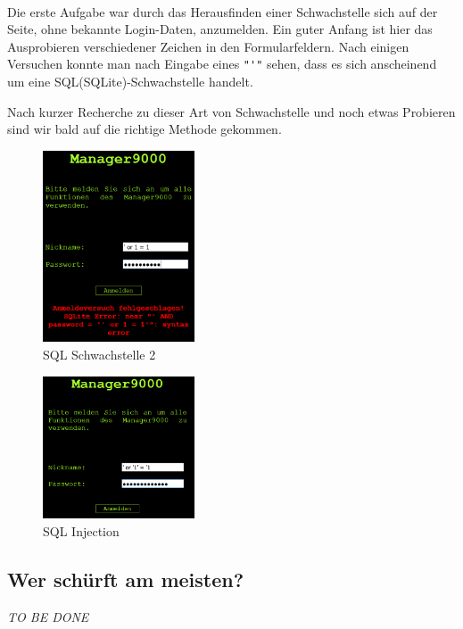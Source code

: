 \documentclass[12pt,a4paper,titlepage,oneside]{scrartcl}
\begin{document}
\

Die erste Aufgabe war durch das Herausfinden einer Schwachstelle sich auf der Seite, ohne bekannte Login-Daten, anzumelden.
Ein guter Anfang ist hier das Ausprobieren verschiedener Zeichen in den Formularfeldern. Nach einigen Versuchen konnte man nach Eingabe eines \lstinline{"'"} sehen, dass es sich anscheinend um eine SQL(SQLite)-Schwachstelle handelt.

Nach kurzer Recherche zu dieser Art von Schwachstelle und noch etwas Probieren sind wir bald auf die richtige Methode gekommen.

\begin{figure}[h!]
  \centering
  \includegraphics[width=0.4\textwidth]{./imgs/manager9000/m9000_sql_error2.png}
\caption{SQL Schwachstelle 2}
\label{fig:sql_weakness2}
\end{figure}

\begin{figure}[h!]
  \centering
  \includegraphics[width=0.4\textwidth]{./imgs/manager9000/m9000_sql_injection.png}
\caption{SQL Injection}
\label{fig:sql_injection}
\end{figure}

\pagebreak

\subsection{Wer schürft am meisten?}
\emph{TO BE DONE}
\end{document}
